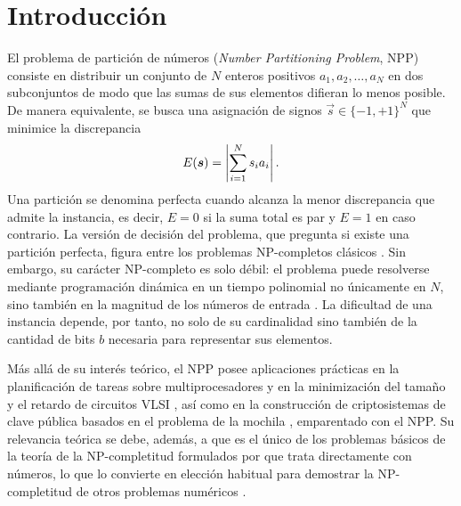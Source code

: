 \chapter*{Introducción}\label{chapter:introduction}

El problema de partición de números (\emph{Number Partitioning Problem}, NPP) consiste en distribuir un conjunto de $N$ enteros positivos $a_1, a_2, \ldots, a_N$ en dos subconjuntos de modo que las sumas de sus elementos difieran lo menos posible. De manera equivalente, se busca una asignación de signos $\vec{s} \in \{-1,+1\}^N$ que minimice la discrepancia
\begin{equation}
    E(\boldsymbol{s}) = \left\lvert \sum_{i=1}^{N} s_i a_i \right\rvert.
    \label{eq:discrepancy}
\end{equation}
Una partición se denomina perfecta cuando alcanza la menor discrepancia que admite la instancia, es decir, $E = 0$ si la suma total es par y $E = 1$ en caso contrario. La versión de decisión del problema, que pregunta si existe una partición perfecta, figura entre los problemas NP-completos clásicos \parencite{garey1979}. Sin embargo, su carácter NP-completo es solo débil: el problema puede resolverse mediante programación dinámica en un tiempo polinomial no únicamente en $N$, sino también en la magnitud de los números de entrada \parencite{garey1979,mertens2001}. La dificultad de una instancia depende, por tanto, no solo de su cardinalidad sino también de la cantidad de bits $b$ necesaria para representar sus elementos.

Más allá de su interés teórico, el NPP posee aplicaciones prácticas en la planificación de tareas sobre multiprocesadores y en la minimización del tamaño y el retardo de circuitos VLSI \parencite{gent1996,mertens2001}, así como en la construcción de criptosistemas de clave pública basados en el problema de la mochila \parencite{merkle1978,mertens2006}, emparentado con el NPP. Su relevancia teórica se debe, además, a que es el único de los problemas básicos de la teoría de la NP-completitud formulados por \textcite{garey1979} que trata directamente con números, lo que lo convierte en elección habitual para demostrar la NP-completitud de otros problemas numéricos \parencite{gent1996,mertens2006}.

